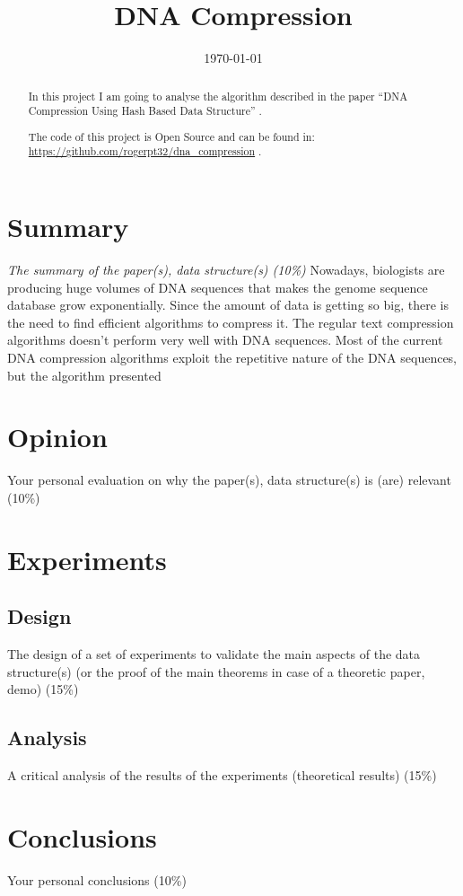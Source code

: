 \documentclass[conference,a4paper]{IEEEtran}
\begin{document}
\title{DNA Compression}

\author{
}

\date{\today}

\maketitle

\begin{abstract}
In this project I am going to analyse the algorithm described in the paper ``DNA Compression Using Hash Based Data Structure'' \cite{paper_dna_compression}.

The code of this project is Open Source and can be found in: \url{https://github.com/rogerpt32/dna_compression} \cite{code}.
\end{abstract}

\section{Summary}
\textit{The summary of the paper(s), data structure(s) (10\%)}
Nowadays, biologists are producing huge volumes of DNA sequences that makes the genome sequence database grow exponentially. Since the amount of data is getting so big, there is the need to find efficient algorithms to compress it. The regular text compression algorithms doesn't perform very well with DNA sequences. Most of the current DNA compression algorithms exploit the repetitive nature of the DNA sequences, but the algorithm presented 

\section{Opinion}
Your personal evaluation on why the paper(s), data structure(s)
is (are) relevant (10\%)

\section{Experiments}
\subsection{Design}
The design of a set of experiments to validate the main aspects of
the data structure(s) (or the proof of the main theorems in case
of a theoretic paper, demo) (15\%)
\subsection{Analysis}
A critical analysis of the results of the experiments (theoretical
results) (15\%)

\section{Conclusions}
Your personal conclusions (10\%)



\end{document}
